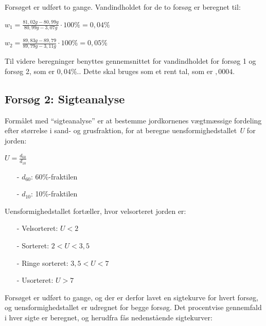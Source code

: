 Forsøget er udført to gange. Vandindholdet for de to forsøg er beregnet til:

\begin{center}
	$w_1 = \frac{81,\!02 g - 80,\!99 g}{80,\!99 g - 3,\!07 g}\cdot 100\% = 0,\!04\%$
\end{center}

\begin{center}
	$w_2 = \frac{89,\!83 g - 89,\!79}{89,\!79 g - 3,\!11 g}\cdot 100\% = 0,\!05\%$
\end{center}

Til videre beregninger benyttes gennemsnittet for vandindholdet for forsøg 1 og forsøg 2, som er $0,\!04$\%.. Dette skal bruges som et rent tal, som er $,\!0004$. 

\subsection{Forsøg 2: Sigteanalyse}
Formålet med “sigteanalyse” er at bestemme jordkornenes vægtmæssige fordeling efter størrelse i sand- og grusfraktion, for at beregne uensformighedstallet \textit{U} for jorden:

\begin{center}
	$U = \frac{d_{60}}{d_{10}}$
\end{center}

\begin{itemize}
	\item[-] $d_{60}$: 60\%-fraktilen
	\item[-] $d_{10}$: 10\%-fraktilen
\end{itemize}

Uensformighedstallet fortæller, hvor velsorteret jorden er:

\begin{itemize}
	\item[-] Velsorteret: $U < 2$
	\item[-] Sorteret: $2 < U < 3,\!5$
	\item[-] Ringe sorteret: $3,\!5 < U < 7$
	\item[-] Usorteret: $U > 7$
\end{itemize}

Forsøget er udført to gange, og der er derfor lavet en sigtekurve for hvert forsøg, og uensformighedstallet er udregnet for begge forsøg. 
\newline \indent{     }  Det procentvise gennemfald i hver sigte er beregnet, og herudfra fås nedenstående sigtekurver: 

